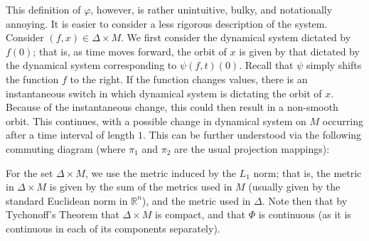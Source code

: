 \documentclass[11pt]{article}
\begin{document}
\indent This definition of $\varphi$, however, is rather unintuitive, bulky, and notationally annoying.  It is easier to consider a less rigorous description of the system.  Consider $(f,x)\in \Delta\times M.$  We first consider the dynamical system dictated by $f(0)$; that is, as time moves forward, the orbit of $x$ is given by that dictated by the dynamical system corresponding to $\psi(f,t)(0)$.  Recall that $\psi$ simply shifts the function $f$ to the right.  If the function changes values, there is an instantaneous switch in which dynamical system is dictating the orbit of $x$.  Because of the instantaneous change, this could then result in a non-smooth orbit.  This continues, with a possible change in dynamical system on $M$ occurring after a time interval of length $1$. This can be further understood via the following commuting diagram (where $\pi_1$ and $\pi_2$ are the usual projection mappings):
\begin{center}
\end{center}

\indent For the set $\Delta\times M$, we use the metric induced by the \textbf{$L_1$} norm; that is, the metric in $\Delta\times M$ is given by the sum of the metrics used in $M$ (usually given by the standard Euclidean norm in $\mathbb{R}^n$), and the metric used in $\Delta$.  Note then that by Tychonoff's  Theorem that $\Delta\times M$ is compact, and that $\Phi$ is continuous (as it is continuous in each of its components separately).  \\

\end{document}
